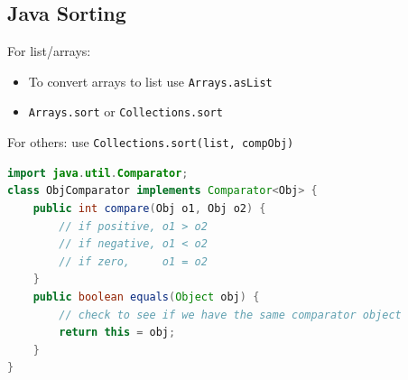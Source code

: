 \documentclass{article}
\begin{document}
\begin{multicols}{2}
\subsection{Java Sorting}
For list/arrays:
\begin{itemize}
	\item To convert arrays to list use \texttt{Arrays.asList}
	\item \texttt{Arrays.sort} or \texttt{Collections.sort}
\end{itemize}
For others: use \texttt{Collections.sort(list, compObj)}
\begin{lstlisting}[language=Java]
import java.util.Comparator;
class ObjComparator implements Comparator<Obj> {
	public int compare(Obj o1, Obj o2) {
		// if positive, o1 > o2
		// if negative, o1 < o2
		// if zero,     o1 = o2
	}
    public boolean equals(Object obj) {
    	// check to see if we have the same comparator object
    	return this = obj;
    }
}\end{lstlisting}



\end{multicols}
\end{document}
